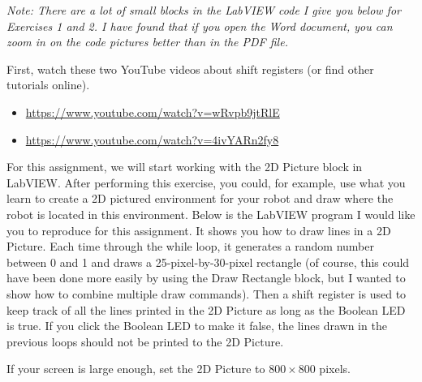 \documentclass[11pt]{article}
\begin{document}
\MakeAssignmentTitle

\textit{Note: There are a lot of small blocks in the LabVIEW code I give you below for Exercises 1 and 2. I have found that if you open the Word document, you can zoom in on the code pictures better than in the PDF file.
}

First, watch these two YouTube videos about shift registers (or find other tutorials online).
\begin{itemize}
    \item \url{https://www.youtube.com/watch?v=wRvpb9jtRlE}
    \item \url{https://www.youtube.com/watch?v=4ivYARn2fy8}
\end{itemize}
%
For this assignment, we will start working with the 2D Picture block in LabVIEW. After performing this exercise, you could, for example, use what you learn to create a 2D pictured environment for your robot and draw where the robot is located in this environment. Below is the LabVIEW program I would like you to reproduce for this assignment. It shows you how to draw lines in a 2D Picture. Each time through the while loop, it generates a random number between 0 and 1 and draws a 25-pixel-by-30-pixel rectangle (of course, this could have been done more easily by using the Draw Rectangle block, but I wanted to show how to combine multiple draw commands). Then a shift register is used to keep track of all the lines printed in the 2D Picture as long as the Boolean LED is true. If you click the Boolean LED to make it false, the lines drawn in the previous loops should not be printed to the 2D Picture.

If your screen is large enough, set the 2D Picture to $800 \times 800$ pixels.
\end{document}
